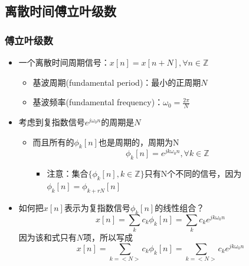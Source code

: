 \documentclass[CJKutf8,xcolor=pdftex,dvipsnames,table]{beamer}
\begin{document}
\begin{CJK*}{UTF8}{song}
  \section{离散时间傅立叶级数}

  \begin{frame}
    \frametitle{傅立叶级数}
    \begin{itemize}
    \item 一个离散时间周期信号：$x[n]=x[n+N], \forall n \in \mathbb{Z}$
        \begin{itemize}
        \item 基波周期(fundamental period)：最小的正周期$N$
        \item 基波频率(fundamental frequency)：$\omega_0=\frac{2\pi}{N}$  
        \end{itemize}  
    \item 考虑到复指数信号$e^{j\omega_0 n}$的周期是$N$
    	\begin{itemize}
		\item 而且所有的$\phi_k[n]$也是周期的，周期为N\[ \phi_k[n]= e^{jk\omega_0 n}, \forall k \in \mathbb{Z} \]
			\begin{itemize}
			\item 注意：集合$\{\phi_k[n], k \in \mathbb{Z}\}$只有N个不同的信号，因为$\phi_k[n]=\phi_{k+rN}[n]$
			\end{itemize}
		\end{itemize}
	\item 如何把$x[n]$表示为复指数信号$\phi_k[n]$的线性组合？\[ x[n] = \sum_k c_k \phi_k[n] = \sum_k c_k e^{jk\omega_0 n} \]
	因为该和式只有$N$项，所以写成
	\[ x[n] = \sum_{k=<N>} c_k \phi_k[n] = \sum_{k=<N>} c_k e^{jk\omega_0 n} \]
    \end{itemize}      
  \end{frame}    
    

\end{CJK*}
\end{document}
